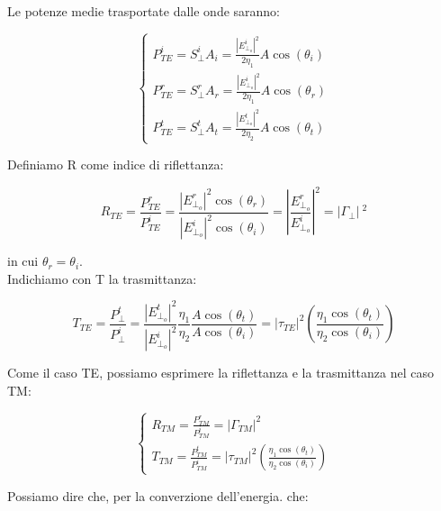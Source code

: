 Le potenze medie trasportate dalle onde saranno: 

{\Large \begin{equation}
    \begin{cases}
        P_{TE} ^{i} = S_\perp ^{i} A_i = \frac{\left|E_{\perp_o} ^{i}\right| ^{2}}{2 \eta_1} A \cos(\theta_i) \\ 
        P_{TE} ^{r} = S_\perp ^{r} A_r = \frac{\left|E_{\perp_o} ^{i}\right| ^{2}}{2 \eta_1} A \cos(\theta_r) \\ 
        P_{TE} ^{t} = S_\perp ^{t} A_t = \frac{\left|E_{\perp_o} ^{t}\right| ^{2}}{2 \eta_2} A \cos(\theta_t) 
    \end{cases}
\end{equation}}

Definiamo R come indice di riflettanza: 

{\Large \begin{equation}
    R_{TE} = \frac{P_{TE} ^{r}}{P_{TE} ^{i}} = \frac{\left|E_{\perp_o} ^{r}\right| ^{2} \cos(\theta_r)}{\left|E_{\perp_o} ^{i}\right| ^{2} \cos(\theta_i)} = \left|\frac{E_{\perp_o} ^{r}}{E_{\perp_o} ^{i}}\right| ^{2} = \left|\Gamma_\perp\right|\ ^{2}  
\end{equation}}

in cui $\theta_r = \theta_i$. \\ 

Indichiamo con T la trasmittanza: 

{\Large \begin{equation}
    T_{TE} = \frac{P_\perp ^{t}}{P_\perp ^{i}} = \frac{\left|E_{\perp_o} ^{t}\right| ^{2}}{\left|E_{\perp_o} ^{i}\right| ^{2}} \frac{\eta_1}{\eta_2} \frac{A \cos(\theta_t)}{A \cos(\theta_i)} = 
    \left|\tau_{TE}\right| ^{2} (\frac{\eta_1 \cos(\theta_t)}{\eta_2 \cos(\theta_i)})
\end{equation}}

Come il caso TE, possiamo esprimere la riflettanza e la trasmittanza nel caso TM: 

{\Large \begin{equation}
    \begin{cases}
        R_{TM} = \frac{P_{TM} ^{r}}{P_{TM} ^{i}} = \left|\Gamma_{TM}\right| ^{2} \\ 
        T_{TM} = \frac{P_{TM} ^{t}}{P_{TM} ^{i}} = \left|\tau_{TM}\right| ^{2}  (\frac{\eta_1 \cos(\theta_t)}{\eta_2 \cos(\theta_i)})
    \end{cases}    
\end{equation}}

Possiamo dire che, per la converzione dell'energia. che: 

